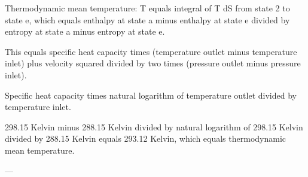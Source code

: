 Thermodynamic mean temperature:  
T equals integral of T dS from state 2 to state e, which equals enthalpy at state a minus enthalpy at state e divided by entropy at state a minus entropy at state e.  

This equals specific heat capacity times (temperature outlet minus temperature inlet) plus velocity squared divided by two times (pressure outlet minus pressure inlet).  

Specific heat capacity times natural logarithm of temperature outlet divided by temperature inlet.  

298.15 Kelvin minus 288.15 Kelvin divided by natural logarithm of 298.15 Kelvin divided by 288.15 Kelvin equals 293.12 Kelvin, which equals thermodynamic mean temperature.  

---